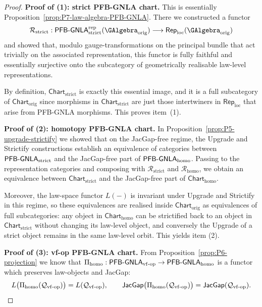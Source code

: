 \documentclass[11pt]{book}
\theoremstyle{plain}
\theoremstyle{definition}
\begin{document}
\begin{proof}
\textbf{Proof of (1): strict PFB-GNLA chart.}
This is essentially Proposition~\ref{prop:P7-law-algebra-PFB-GNLA}.
There we constructed a functor
\[
  \mathcal{R}_{\mathrm{strict}} :
  \mathsf{PFB\text- GNLA}^{\mathrm{rep}}_{\mathrm{strict}}
    (\GAlgebra_{\mathrm{orig}})
  \longrightarrow
  \mathsf{Rep}_{\mathrm{loc}}(\GAlgebra_{\mathrm{orig}})
\]
and showed that, modulo gauge-transformations on the principal bundle
that act trivially on the associated representation, this functor is
fully faithful and essentially surjective onto the subcategory of
geometrically realisable law-level representations.

By definition,
\(\mathsf{Chart}_{\mathrm{strict}}\) is exactly this essential image,
and it is a full subcategory of \(\mathsf{Chart}_{\mathrm{orig}}\)
since morphisms in \(\mathsf{Chart}_{\mathrm{strict}}\) are just those
intertwiners in \(\mathsf{Rep}_{\mathrm{loc}}\) that arise from
PFB-GNLA morphisms.  This proves item~\textnormal{(1)}.



\medskip\noindent
\textbf{Proof of (2): homotopy PFB-GNLA chart.}
In Proposition~\ref{prop:P5-upgrade-strictify} we showed that on the
JacGap-free regime, the Upgrade and Strictify constructions establish
an equivalence of categories between
\(\mathsf{PFB\text- GNLA}_{\mathrm{strict}}\) and the JacGap-free part
of \(\mathsf{PFB\text- GNLA}_{\mathrm{homo}}\).  Passing to the
representation categories and composing with
\(\mathcal{R}_{\mathrm{strict}}\) and \(\mathcal{R}_{\mathrm{homo}}\),
we obtain an equivalence between
\(\mathsf{Chart}_{\mathrm{strict}}\) and the JacGap-free part of
\(\mathsf{Chart}_{\mathrm{homo}}\).

Moreover, the law-space functor \(L(-)\) is invariant under Upgrade
and Strictify in this regime, so these equivalences are realised
inside \(\mathsf{Chart}_{\mathrm{orig}}\) as equivalences of full
subcategories: any object in
\(\mathsf{Chart}_{\mathrm{homo}}\) can be strictified back to an
object in \(\mathsf{Chart}_{\mathrm{strict}}\) without changing its
law-level object, and conversely the Upgrade of a strict object
remains in the same law-level orbit.  This yields item
\textnormal{(2)}.



\medskip\noindent
\textbf{Proof of (3): vf-op PFB-GNLA chart.}
From Proposition~\ref{prop:P6-projection} we know that
\(\Pi_{\mathrm{homo}} : \mathsf{PFB\text- GNLA}_{\mathrm{vf\text- op}}
\to \mathsf{PFB\text- GNLA}_{\mathrm{homo}}\) is a functor which
preserves law-objects and JacGap:
\[
  L\bigl(\Pi_{\mathrm{homo}}(\mathcal{Q}_{\mathrm{vf\text- op}})\bigr)
  = L(\mathcal{Q}_{\mathrm{vf\text- op}}),
  \qquad
  \mathsf{JacGap}\bigl(
    \Pi_{\mathrm{homo}}(\mathcal{Q}_{\mathrm{vf\text- op}})
  \bigr)
  =
  \mathsf{JacGap}(\mathcal{Q}_{\mathrm{vf\text- op}}).
\]


\end{proof}
\end{document}
